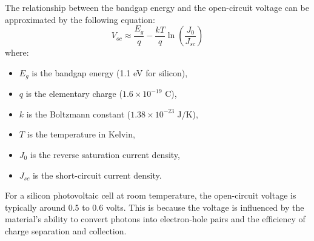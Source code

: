 The relationship between the bandgap energy and the open-circuit voltage can be approximated by the following equation:
\[
V_{oc} \approx \frac{E_g}{q} - \frac{kT}{q} \ln\left(\frac{J_0}{J_{sc}}\right)
\]
where:
\begin{itemize}
    \item \(E_g\) is the bandgap energy (1.1 eV for silicon),
    \item \(q\) is the elementary charge (\(1.6 \times 10^{-19}\) C),
    \item \(k\) is the Boltzmann constant (\(1.38 \times 10^{-23}\) J/K),
    \item \(T\) is the temperature in Kelvin,
    \item \(J_0\) is the reverse saturation current density,
    \item \(J_{sc}\) is the short-circuit current density.
\end{itemize}

For a silicon photovoltaic cell at room temperature, the open-circuit voltage is typically around 0.5 to 0.6 volts. This is because the voltage is influenced by the material's ability to convert photons into electron-hole pairs and the efficiency of charge separation and collection.

